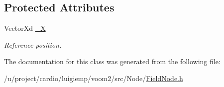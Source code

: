 \subsection*{Protected Attributes}
\begin{DoxyCompactItemize}
\item 
\hypertarget{classvoom_1_1_field_node_aa0eecce8de1392ac78a8b194ef9dfdcb}{
VectorXd \hyperlink{classvoom_1_1_field_node_aa0eecce8de1392ac78a8b194ef9dfdcb}{\_\-X}}
\label{classvoom_1_1_field_node_aa0eecce8de1392ac78a8b194ef9dfdcb}

\begin{DoxyCompactList}\small\item\em Reference position. \item\end{DoxyCompactList}\end{DoxyCompactItemize}


The documentation for this class was generated from the following file:\begin{DoxyCompactItemize}
\item 
/u/project/cardio/luigiemp/voom2/src/Node/\hyperlink{_field_node_8h}{FieldNode.h}\end{DoxyCompactItemize}
